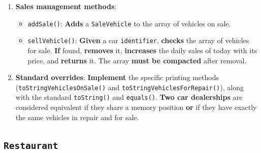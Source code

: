 \begin{enumerate}
\begin{itemize}
        \end{itemize}

    \item \textbf{Sales management methods}:

        \begin{itemize}

            \item \texttt{addSale()}: \textbf{Adds} a \texttt{SaleVehicle} to the array of vehicles on sale.

            \item \texttt{sellVehicle()}: \textbf{Given} a car \texttt{identifier}, \textbf{checks} the array of vehicles for sale. \textbf{If} found, \textbf{removes} it, \textbf{increases} the daily sales of today with its price, and \textbf{returns} it. The array \textbf{must be compacted} after removal.

        \end{itemize}

    \item \textbf{Standard overrides}: \textbf{Implement} the specific printing methods (\texttt{toStringVehiclesOnSale()} and \texttt{toStringVehiclesForRepair()}), along with the standard \texttt{toString()} and \texttt{equals()}. \textbf{Two car dealerships} are considered equivalent if they share a memory position \textbf{or} if they have exactly the same vehicles in repair and for sale.

\end{enumerate}

\subsection{\texttt{Restaurant}}

